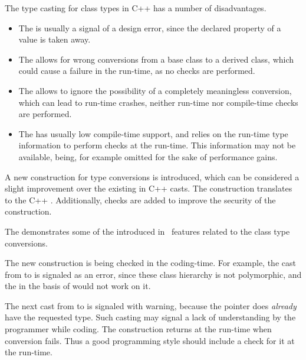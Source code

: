The type casting for class types in C++ has a number of disadvantages.
\begin{itemize}
 \item The  is usually a signal of a design error, since the 
 declared  property of a value is taken away.
 
 \item The  allows for wrong conversions from a base class to a derived class,
 which could cause a failure in the run-time, as no checks are performed.
 
 \item The  allows to ignore the possibility of  
  a completely meaningless conversion, which can lead to run-time crashes, neither run-time nor 
  compile-time checks are performed.
 
 \item The  has usually low compile-time support, and relies on the run-time type
  information to perform checks at the run-time. This information may not be available, being,
  for example omitted for the sake of performance gains.
\end{itemize}


\pcppsolution

A new construction for type conversions is introduced, which can be considered a slight improvement
over the existing in C++ casts. The  construction translates to the C++ .
Additionally, checks are added to improve the security of the construction.


The  demonstrates some of the introduced in \pcpp\ features related to the class type conversions.

The new  construction is being checked in the coding-time. For example, the cast from  to 
 is signaled as an error, since these class hierarchy is not polymorphic, and the 
in the basis of  would not work on it.

The next cast from  to  is signaled with warning, because the  pointer does 
\emph{already} have the requested type. Such casting may signal a lack of understanding by the programmer while coding.
The  construction returns  at the run-time when conversion fails. Thus a good programming style
should include a check for it at the run-time.

